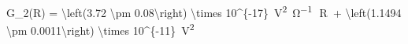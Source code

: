 G_2(R) = \SI[parse-numbers = false]{\left(3.72 \pm 0.08\right) \times 10^{-17}}{\volt^2\per\ohm}\, \cdot \,R\, + \SI[parse-numbers = false]{\left(1.1494 \pm 0.0011\right) \times 10^{-11}}{\volt^2}